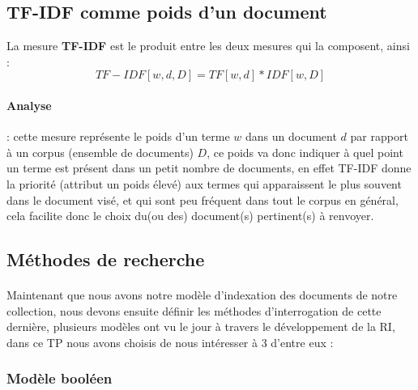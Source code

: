 \documentclass[12pt]{report}
\begin{document}
		\subsection{TF-IDF comme poids d'un document}
		La mesure \textbf{TF-IDF} est le produit entre les deux mesures qui la composent, ainsi : 
		\begin{equation*}
			TF-IDF[w,d,D] = TF[w,d] * IDF[w,D]
		\end{equation*}
		\paragraph{Analyse} : cette mesure représente le poids d'un terme $w$ dans un document $d$ par rapport à un corpus
		(ensemble de documents) $D$, ce poids va donc indiquer à quel point un terme est présent dans un petit nombre de 
		documents, en effet TF-IDF donne la priorité (attribut un poids élevé) aux termes qui apparaissent le plus souvent
		dans le document visé, et qui sont peu fréquent dans tout le corpus en général, cela facilite donc le choix du(ou des)
		document(s) pertinent(s) à renvoyer.
		
		
		\subsection{Méthodes de recherche}
		\paragraph{}
		Maintenant que nous avons notre modèle d'indexation des documents de notre collection, nous devons ensuite définir
		les méthodes d'interrogation de cette dernière, plusieurs modèles ont vu le jour à travers le développement de la 
		RI, dans ce TP nous avons choisis de nous intéresser à 3 d'entre eux : 
			\subsubsection{Modèle booléen}
\end{document}
